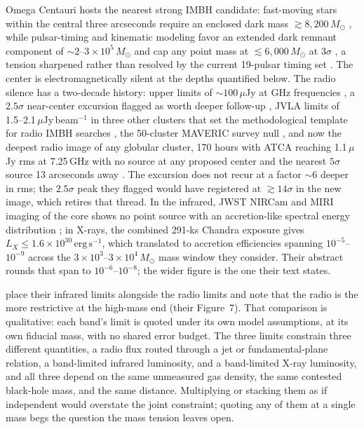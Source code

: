 \documentclass[11pt]{article}
\newcommand{\msun}{\ensuremath{M_\odot}}
\begin{document}
Omega Centauri hosts the nearest strong IMBH candidate: fast-moving stars within the central three arcseconds require an enclosed dark mass $\gtrsim 8{,}200\,\msun$ \citep{Haberle2024Nature}, while pulsar-timing and kinematic modeling favor an extended dark remnant component of $\sim 2\text{--}3\times10^{5}\,\msun$ and cap any point mass at $\lesssim 6{,}000\,\msun$ at $3\sigma$ \citep{BanaresHernandez2025}, a tension sharpened rather than resolved by the current 19-pulsar timing set \citep{ColomiBernadich2026}. The center is electromagnetically silent at the depths quantified below. The radio silence has a two-decade history: upper limits of $\sim 100\,\mu$Jy at GHz frequencies \citep{Maccarone2005}, a $2.5\sigma$ near-center excursion flagged as worth deeper follow-up \citep{LuKong2011}, JVLA limits of 1.5--2.1\,$\mu$Jy\,beam$^{-1}$ in three other clusters that set the methodological template for radio IMBH searches \citep{Strader2012}, the 50-cluster MAVERIC survey null \citep{Tremou2018}, and now the deepest radio image of any globular cluster, 170 hours with ATCA reaching 1.1\,$\mu$Jy rms at 7.25\,GHz with no source at any proposed center and the nearest $5\sigma$ source 13 arcseconds away \citep{Mahida2026}. The \citet{LuKong2011} excursion does not recur at a factor $\sim$6 deeper in rms; the $2.5\sigma$ peak they flagged would have registered at $\gtrsim14\sigma$ in the new image, which retires that thread. In the infrared, JWST NIRCam and MIRI imaging of the core shows no point source with an accretion-like spectral energy distribution \citep{Chen2025JWST}; in X-rays, the combined 291-ks Chandra exposure gives $L_X \leq 1.6\times10^{30}\,\mathrm{erg\,s^{-1}}$, which \citet{Haggard2013} translated to accretion efficiencies spanning $10^{-5}$--$10^{-9}$ across the $3\times10^{3}$--$3\times10^{4}\,\msun$ mass window they consider. Their abstract rounds that span to $10^{-6}$--$10^{-8}$; the wider figure is the one their text states.

\citet{Chen2025JWST} place their infrared limits alongside the radio limits and note that the radio is the more restrictive at the high-mass end (their Figure~7). That comparison is qualitative: each band's limit is quoted under its own model assumptions, at its own fiducial mass, with no shared error budget. The three limits constrain three different quantities, a radio flux routed through a jet or fundamental-plane relation, a band-limited infrared luminosity, and a band-limited X-ray luminosity, and all three depend on the same unmeasured gas density, the same contested black-hole mass, and the same distance. Multiplying or stacking them as if independent would overstate the joint constraint; quoting any of them at a single mass begs the question the mass tension leaves open.
\end{document}
